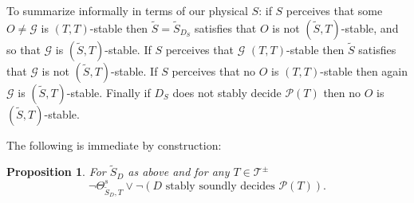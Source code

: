 \documentclass{amsart}  %
\numberwithin{equation}{section}
\newtheorem{proposition}[equation]{Proposition}
\theoremstyle{definition}
\theoremstyle{remark}
\begin{document}
{To summarize informally in terms of our physical $S$: if $S$ perceives that some $O \neq \mathcal{G}$ is 
$(T,T)$-stable then $\widetilde{S}=\widetilde{S} _{D _{S} }  $ satisfies that 
$O$ is not $(\widetilde{S},T) $-stable, and so that $\mathcal{G}$ is $(\widetilde{S},T) $-stable. If $S$ perceives that $\mathcal{G}$ $(T,T)$-stable then $\widetilde{S}$ satisfies that $\mathcal{G}$ is not $(\widetilde{S},T) $-stable. 
If $S$ perceives that no $O$ is $(T,T)$-stable then again $\mathcal{G}$ is $(\widetilde{S},T) $-stable. 
Finally if $D _{S} $ does not stably decide $\mathcal{P} (T)$ then no $O$ is $(\widetilde{S}, T) $-stable. 


The following is immediate by construction:
\begin{proposition} \label{thm:2} 
For $\widetilde{S} _{D}  $ as above and for any $T \in \mathcal{T} ^{\pm}$
\begin{equation*}
      \neg \Theta ^{s} _{\widetilde{S} _{D}, T}  \lor  \neg (\text{$D  $ stably soundly decides $\mathcal{P}(T)$}).
\end{equation*}
\end{proposition} 


}
\end{document}
